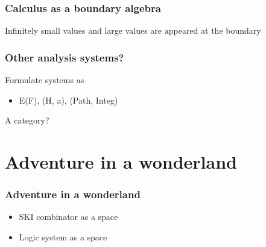 \documentclass[aspectratio=169]{beamer}
\begin{document}
\begin{frame}
\frametitle{Calculus as a boundary algebra}
Infinitely small values and large values are appeared at the boundary
\begin{figure}[ht]\centering
{}
\end{figure}
\end{frame}

\begin{frame}
\frametitle{Other analysis systems?}
    Formulate systems as
    \begin{itemize}
        \item E(F), (H, a), (Path, Integ)
    \end{itemize}
    A category?
\end{frame}

\section{Adventure in a wonderland}

\begin{frame}
\frametitle{Adventure in a wonderland}
    \begin{itemize}
        \item SKI combinator as a space
        \item Logic system as a space
    \end{itemize}
\end{frame}
\end{document}
